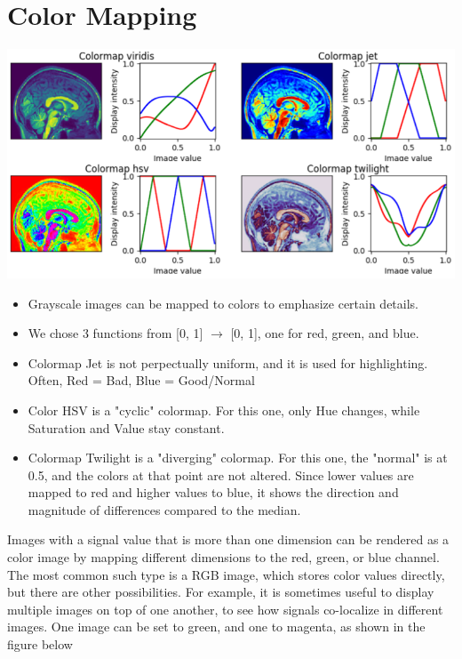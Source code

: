 \documentclass[10pt]{article}
\begin{document}
\section*{Color Mapping}
\begin{center}
    \includegraphics[scale=0.8]{W1_9.png}
\end{center}
\begin{itemize}
    \item Grayscale images can be mapped to colors to emphasize certain details.
    \item We chose 3 functions from [0, 1] $\rightarrow$ [0, 1], one for red, green, and blue.
    \item Colormap Jet is not perpectually uniform, and it is used for highlighting.  Often, Red = Bad, Blue = Good/Normal
    \item Color HSV is a "cyclic" colormap.  For this one, only Hue changes, while Saturation and Value stay constant.
    \item Colormap Twilight is a "diverging" colormap.  For this one, the "normal" is at 0.5, and the colors at that point are not altered.  Since lower values are mapped to red and higher values to blue, it shows the direction and magnitude of differences compared to the median.
\end{itemize}
Images with a signal value that is more than one dimension can be rendered as a color image by mapping different dimensions to the red, green, or blue channel.  The most common such type is a RGB image, which stores color values directly, but there are other possibilities.  For example, it is sometimes useful to display multiple images on top of one another, to see how signals co-localize in different images.  One image can be set to green, and one to magenta, as shown in the figure below
\end{document}
